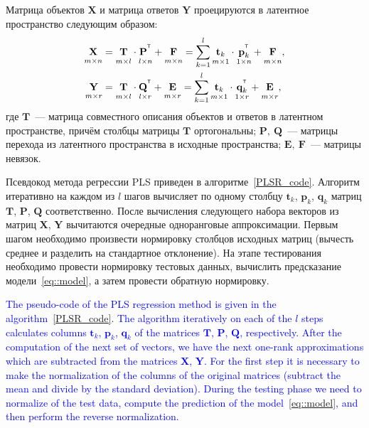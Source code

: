 \documentclass[12pt,twoside]{article}
\newcommand{\bY}{\mathbf{Y}}
\newcommand{\bX}{\mathbf{X}}
\newcommand{\bt}{\mathbf{t}}
\newcommand{\bp}{\mathbf{p}}
\newcommand{\bq}{\mathbf{q}}
\newcommand{\bP}{\mathbf{P}}
\newcommand{\bT}{\mathbf{T}}
\newcommand{\bQ}{\mathbf{Q}}
\newcommand{\bE}{\mathbf{E}}
\newcommand{\bF}{\mathbf{F}}
\newcommand{\T}{^{\text{\tiny\sffamily\upshape\mdseries T}}}
\begin{document}
Матрица объектов $\bX$ и матрица ответов $\bY$ проецируются в латентное пространство следующим образом: 
\begin{align}
\label{eq::PLS_X}
 \underset{m \times n}{\vphantom{\bQ}\bX} 
 &= \underset{m \times l}{\vphantom{\bQ}\bT} \cdot \underset{l \times n}{\vphantom{\bQ}\bP^{\T}} + \underset{m \times n}{\vphantom{\bQ}\bF} 
 = \sum_{k=1}^l \underset{m \times 1}{\vphantom{\bp_k^{\T}}\bt_k} \cdot \underset{1 \times n}{\bp_k^{\T}} + \underset{m \times n}{\vphantom{\bp_k^{\T}}\bF},\\
 \label{eq::PLS_Y}
 \underset{m \times r}{\vphantom{\bQ}\bY} 
 &= \underset{m \times l}{\vphantom{\bQ}\bT} \cdot \underset{l \times r}{\bQ^{\T}} + \underset{m \times r}{\vphantom{\bQ}\bE}
 =  \sum_{k=1}^l  \underset{m \times 1}{\vphantom{\bq_k^{\T}}\bt_k} \cdot \underset{1 \times r}{\bq_k^{\T}} +  \underset{m \times r}{\vphantom{\bq_k^{\T}}\bE},
\end{align}
где $\bT$~--- матрица совместного описания объектов и ответов в латентном пространстве, причём столбцы матрицы $\bT$ ортогональны; $\bP,\ \bQ$~--- матрицы перехода из латентного пространства в  исходные пространства; $\bE,\ \bF$~--- матрицы невязок. 

Псевдокод метода регрессии PLS приведен в алгоритме~\ref{PLSR_code}.
Алгоритм итеративно на каждом из $l$ шагов вычисляет по одному столбцу $\bt_k$, $\bp_k$, $\bq_k$ матриц $\bT$, $\bP$, $\bQ$ соответственно. После вычисления следующего набора векторов из матриц $\bX$, $\bY$ вычитаются очередные одноранговые аппроксимации. 
Первым шагом необходимо произвести нормировку столбцов исходных матриц (вычесть среднее и разделить на стандартное отклонение).
На этапе тестирования необходимо провести нормировку тестовых данных, вычислить предсказание модели~\ref{eq::model}, а затем провести обратную нормировку.

\textcolor{blue}{
The pseudo-code of the PLS regression method is given in the algorithm~\ref{PLSR_code}.
The algorithm iteratively on each of the $l$ steps calculates columns $\bt_k$, $\bp_k$, $\bq_k$ of the matrices $\bT$, $\bP$, $\bQ$, respectively. After the computation of the next set of vectors, we have the next one-rank approximations which are subtracted from the matrices $\bX$, $\bY$.
For the first step it is necessary to make the normalization of the columns of the original matrices (subtract the mean and divide by the standard deviation).
During the testing phase we need to normalize of the test data, compute the prediction of the model~\ref{eq::model}, and then perform the reverse normalization.}
\end{document}
